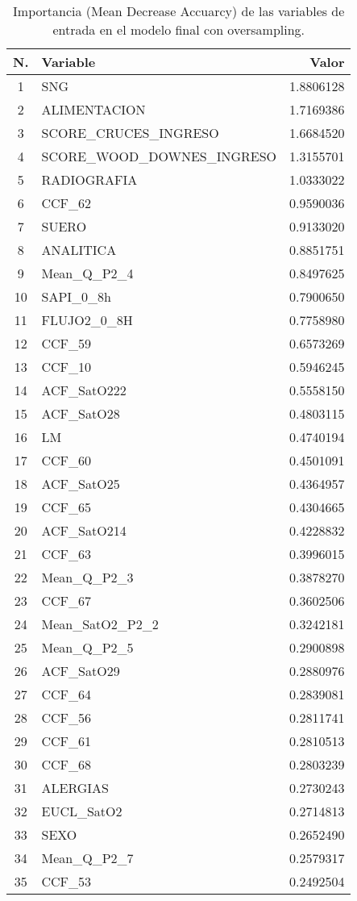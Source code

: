 \begin{table}[H]
    \centering
    \begin{tabular}{|c|l|r|}
        \hline
        \textbf{N.} & \textbf{Variable} & \textbf{Valor} \\
        \hline
        1 & SNG & 1.8806128 \\
        2 & ALIMENTACION & 1.7169386 \\
        3 & SCORE\_CRUCES\_INGRESO & 1.6684520 \\
        4 & SCORE\_WOOD\_DOWNES\_INGRESO & 1.3155701 \\
        5 & RADIOGRAFIA & 1.0333022 \\
        6 & CCF\_62 & 0.9590036 \\
        7 & SUERO & 0.9133020 \\
        8 & ANALITICA & 0.8851751 \\
        9 & Mean\_Q\_P2\_4 & 0.8497625 \\
        10 & SAPI\_0\_8h & 0.7900650 \\
        11 & FLUJO2\_0\_8H & 0.7758980 \\
        12 & CCF\_59 & 0.6573269 \\
        13 & CCF\_10 & 0.5946245 \\
        14 & ACF\_SatO222 & 0.5558150 \\
        15 & ACF\_SatO28 & 0.4803115 \\
        16 & LM & 0.4740194 \\
        17 & CCF\_60 & 0.4501091 \\
        18 & ACF\_SatO25 & 0.4364957 \\
        19 & CCF\_65 & 0.4304665 \\
        20 & ACF\_SatO214 & 0.4228832 \\
        21 & CCF\_63 & 0.3996015 \\
        22 & Mean\_Q\_P2\_3 & 0.3878270 \\
        23 & CCF\_67 & 0.3602506 \\
        24 & Mean\_SatO2\_P2\_2 & 0.3242181 \\
        25 & Mean\_Q\_P2\_5 & 0.2900898 \\
        26 & ACF\_SatO29 & 0.2880976 \\
        27 & CCF\_64 & 0.2839081 \\
        28 & CCF\_56 & 0.2811741 \\
        29 & CCF\_61 & 0.2810513 \\
        30 & CCF\_68 & 0.2803239 \\
        31 & ALERGIAS & 0.2730243 \\
        32 & EUCL\_SatO2 & 0.2714813 \\
        33 & SEXO & 0.2652490 \\
        34 & Mean\_Q\_P2\_7 & 0.2579317 \\
        35 & CCF\_53 & 0.2492504 \\
        \hline
    \end{tabular}
    \caption{Importancia (Mean Decrease Accuarcy) de las variables de entrada en el modelo final con oversampling.}
    \label{tabla:importancia_variables_modelo_final}
\end{table}

